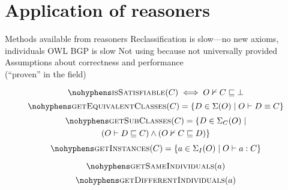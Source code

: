 \documentclass[paper.tex]{subfiles}
\begin{document}
\section{Application of reasoners}
\label{sec:reasoners}

\begin{todos}
  \todo Methods available from reasoners
  \todo Reclassification is slow---no new axioms, individuals
  \todo OWL BGP is slow
  \todo Not using  because not universally provided
  \todo Assumptions about correctness and performance \\(``proven'' in the field)
\end{todos}

\todo[in ontology $O$]

\[ \textproc{isSatisfiable}(C) \iff O \nsementails C \sqsubseteq \bot \]
\[ \textproc{getEquivalentClasses}(C) = \{ D \in \signature(O) \mid O \sementails D \equiv C \} \]
\begin{multline*}
  \textproc{getSubClasses}(C) =
  \{
    D \in \signature_C(O)
  \mid \\
    (O \sementails D \sqsubseteq C) \land (O \nsementails C \sqsubseteq D)
  \}
\end{multline*}
\[ \textproc{getInstances}(C) = \{ a \in \signature_I(O) \mid O \sementails a : C \} \]

\[ \textproc{getSameIndividuals}(a) \]
\[ \textproc{getDifferentIndividuals}(a) \]

\end{document}
